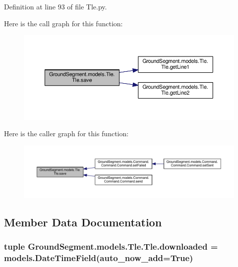 Definition at line 93 of file Tle.\+py.



Here is the call graph for this function\+:\nopagebreak
\begin{figure}[H]
\begin{center}
\leavevmode
\includegraphics[width=350pt]{class_ground_segment_1_1models_1_1_tle_1_1_tle_af9530755ce563a47367a4636878d63bb_cgraph}
\end{center}
\end{figure}




Here is the caller graph for this function\+:\nopagebreak
\begin{figure}[H]
\begin{center}
\leavevmode
\includegraphics[width=350pt]{class_ground_segment_1_1models_1_1_tle_1_1_tle_af9530755ce563a47367a4636878d63bb_icgraph}
\end{center}
\end{figure}




\subsection{Member Data Documentation}
\hypertarget{class_ground_segment_1_1models_1_1_tle_1_1_tle_ae3785c68a686c40d0505afe276d13d04}{}
\subsubsection[{downloaded}]{\setlength{\rightskip}{0pt plus 5cm}tuple Ground\+Segment.\+models.\+Tle.\+Tle.\+downloaded = models.\+Date\+Time\+Field(auto\+\_\+now\+\_\+add=True)\hspace{0.3cm}{\ttfamily [static]}}\label{class_ground_segment_1_1models_1_1_tle_1_1_tle_ae3785c68a686c40d0505afe276d13d04}


